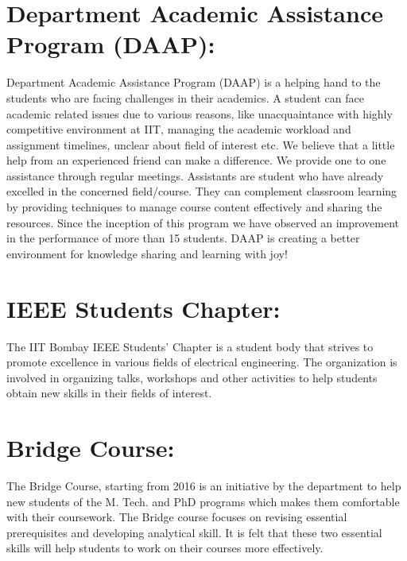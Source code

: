 \documentclass[11pt,fleqn,openany]{book} %
\begin{document}
\section {Department Academic Assistance Program (DAAP):}
Department Academic Assistance Program (DAAP) is a helping hand to the students who are facing challenges in their academics. A student can face academic related issues due to various reasons, like unacquaintance with highly competitive environment at IIT, managing the academic
workload and assignment timelines, unclear about field of interest etc. We believe that a little help from an experienced friend can make a difference. We provide one to one assistance through regular meetings. Assistants are student who have already excelled in the concerned field/course. They can complement classroom learning by providing techniques to manage course content effectively and sharing the resources. Since the inception of this program we have observed an improvement in the performance of more than 15 students. DAAP is creating a better environment for knowledge sharing and learning with joy!
\newline
\section {IEEE Students Chapter:}
The IIT Bombay IEEE Students’ Chapter is a student body that strives to promote excellence in various fields of electrical engineering. The organization is involved in organizing talks, workshops and other activities to help students obtain new skills in their fields of interest.\newline
\section {Bridge Course:}
The Bridge Course, starting from 2016 is an initiative by the department to help new students of the M. Tech. and PhD programs which makes them comfortable with their coursework. The Bridge course focuses on revising essential prerequisites and developing analytical skill. It is felt that these two essential skills will help students to work on their courses more effectively.\newline
\end{document}

